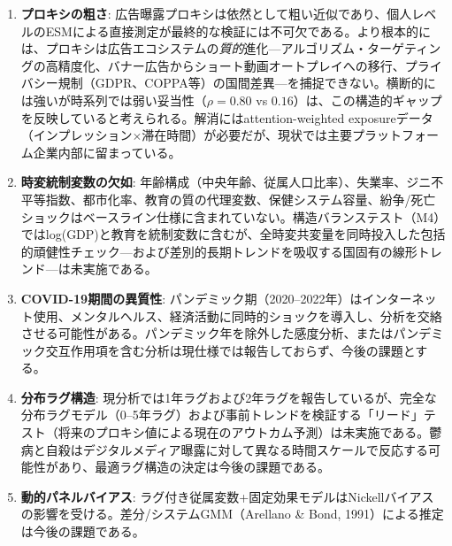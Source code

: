 \documentclass[a4paper,11pt,titlepage]{article}
\begin{document}
\begin{enumerate}
  \item \textbf{プロキシの粗さ}: 広告曝露プロキシは依然として粗い近似であり、個人レベルのESMによる直接測定が最終的な検証には不可欠である。より根本的には、プロキシは広告エコシステムの\emph{質的}進化---アルゴリズム・ターゲティングの高精度化、バナー広告からショート動画オートプレイへの移行、プライバシー規制（GDPR、COPPA等）の国間差異---を捕捉できない。横断的には強いが時系列では弱い妥当性（$\rho = 0.80$ vs $0.16$）は、この構造的ギャップを反映していると考えられる。解消にはattention-weighted exposureデータ（インプレッション$\times$滞在時間）が必要だが、現状では主要プラットフォーム企業内部に留まっている。
  \item \textbf{時変統制変数の欠如}: 年齢構成（中央年齢、従属人口比率）、失業率、ジニ不平等指数、都市化率、教育の質の代理変数、保健システム容量、紛争/死亡ショックはベースライン仕様に含まれていない。構造バランステスト（M4）ではlog(GDP)と教育を統制変数に含むが、全時変共変量を同時投入した包括的頑健性チェック---および差別的長期トレンドを吸収する国固有の線形トレンド---は未実施である。
  \item \textbf{COVID-19期間の異質性}: パンデミック期（2020--2022年）はインターネット使用、メンタルヘルス、経済活動に同時的ショックを導入し、分析を交絡させる可能性がある。パンデミック年を除外した感度分析、またはパンデミック交互作用項を含む分析は現仕様では報告しておらず、今後の課題とする。
  \item \textbf{分布ラグ構造}: 現分析では1年ラグおよび2年ラグを報告しているが、完全な分布ラグモデル（0--5年ラグ）および事前トレンドを検証する「リード」テスト（将来のプロキシ値による現在のアウトカム予測）は未実施である。鬱病と自殺はデジタルメディア曝露に対して異なる時間スケールで反応する可能性があり、最適ラグ構造の決定は今後の課題である。
  \item \textbf{動的パネルバイアス}: ラグ付き従属変数+固定効果モデルはNickellバイアスの影響を受ける。差分/システムGMM（Arellano \& Bond, 1991）による推定は今後の課題である。

\end{enumerate}
\end{document}
